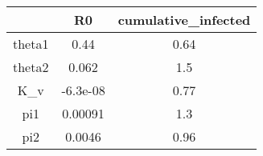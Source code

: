 \begin{tabular}{|c|c|c|}
\hline
& R0 & cumulative_infected \\
\hline
theta1 & 0.44 & 0.64 \\
\hline
theta2 & 0.062 & 1.5 \\
\hline
K_v & -6.3e-08 & 0.77 \\
\hline
pi1 & 0.00091 & 1.3 \\
\hline
pi2 & 0.0046 & 0.96 \\
\hline
\end{tabular}
